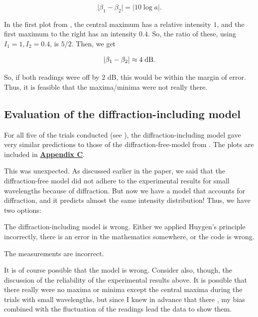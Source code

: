 \documentclass{paper}
\begin{document}
\begin{equation*}
    \lvert \beta_1 - \beta_2 \rvert = \lvert 10\log a \rvert.
\end{equation*}

In the first plot from , the central maximum has a relative intensity $1$, and the first maximum to the right has an intensity $0.4$. So, the ratio of these, using $I_1 = 1, I_2 = 0.4$, is
$5/2$. Then, we get

\begin{equation*}
    \lvert \beta_1 - \beta_2 \rvert \approx 4 \; \textnormal{dB}.
\end{equation*}

So, if both readings were off by $2$ dB, this would be within the margin of error. Thus, it is feasible that the maxima/minima were not really there.

\subsection{Evaluation of the diffraction-including model}

For all five of the trials conducted (see ), the diffraction-including model gave very similar predictions to those of the diffraction-free-model from . The plots are included in \textbf{\hyperref[appendix:diffraction-plots]{Appendix C}}.

This was unexpected. As discussed earlier in the paper, we said that the diffraction-free model did not adhere to the experimental results for small wavelengths because of diffraction. But now we have a model that accounts for diffraction, and it predicts almost the same intensity distribution! Thus, we have two options:

\begin{boldenumerate}
    \item The diffraction-including model is wrong. Either we applied Huygen's principle incorrectly, there is an error in the mathematics somewhere, or the code is wrong.
    
    \item The measurements are incorrect.
\end{boldenumerate}

It is of course possible that the model is wrong. Consider also, though, the discussion of the reliability of the experimental results above. It is possible that there really were no maxima or minima except the central maxima during the trials with small wavelengths, but since I knew in advance that there , my bias combined with the fluctuation of the readings lead the data to show them.
\end{document}
